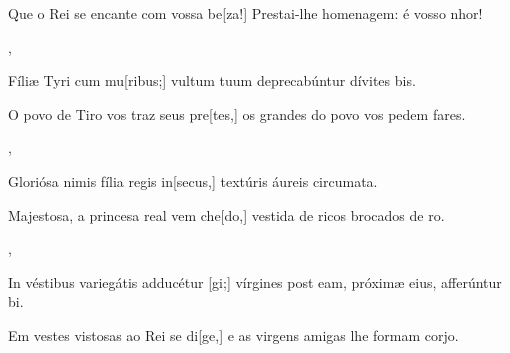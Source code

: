 {        {\item {}Que o Rei se encante com vossa be[za!] Prestai-lhe homenagem: é vosso nhor!~\Responsorium},
    {\item {}Fíliæ Tyri cum mu[ribus;] vultum tuum deprecabúntur dívites bis.~\Responsorium}%
        {\item {}O povo de Tiro vos traz seus pre[tes,] os grandes do povo vos pedem fares.~\Responsorium},
    {\item {}Gloriósa nimis fília regis in[secus,] textúris áureis circumata.~\Responsorium}%
        {\item {}Majestosa, a princesa real vem che[do,] vestida de ricos brocados de ro.~\Responsorium},
    {\item {}In véstibus variegátis adducétur [gi;] vírgines post eam, próximæ eius, afferúntur bi.~\Responsorium}%
        {\item {}Em vestes vistosas ao Rei se di[ge,] e as virgens amigas lhe formam corjo.~\Responsorium}
}